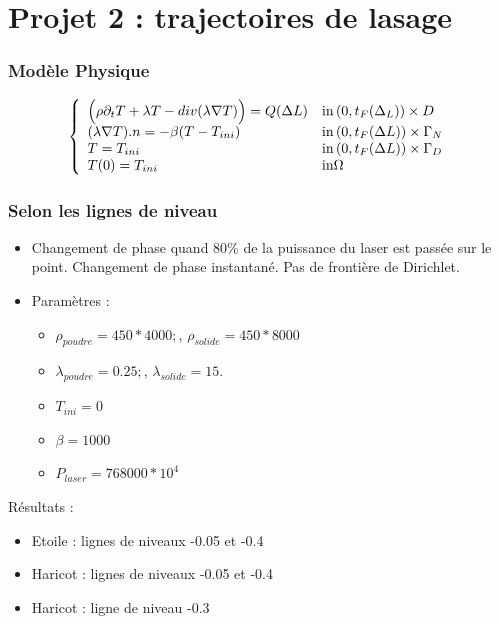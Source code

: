\documentclass{beamer}
\begin{document}
	
	\section{Projet 2 : trajectoires de lasage}
	
	\begin{frame}
		\frametitle{Modèle Physique}
		
		\begin{equation}
		\label{eq:ChaleurNormale}
		\left\{
		\begin{array}{ll}
		\Big(\rho\partial_t T+\lambda T-div(\lambda\nabla T)\Big)=Q(\Delta L)& \textrm{in\,}(0,t_F(\Delta_L))\times D \\
		(\lambda\nabla T).n=-\beta(T-T_{ini}) & \textrm{in\,}(0,t_F(\Delta L))\times \Gamma_N \\
		T=T_{ini} & \textrm{in\,}(0,t_F(\Delta L))\times \Gamma_D \\
		T(0)=T_{ini} & \textrm{in} \Omega
		\end{array}
		\right.
		\end{equation}
		
	\end{frame}
	
	
	
	\begin{frame}
		\frametitle{Selon les lignes de niveau}
		
		\begin{itemize}
			\item Changement de phase quand 80\% de la puissance du laser est passée sur le point. Changement de phase instantané. Pas de frontière de Dirichlet.
			\item Paramètres :
			\begin{itemize}
				\item $\rho_{poudre}=450*4000;$, $\rho_{solide}=450*8000$
				\item $\lambda_{poudre}=0.25;$, $\lambda_{solide}=15.$
				\item $T_{ini}=0$
				\item $\beta=1000$
				\item $P_{laser}=768000*10^4$
			\end{itemize}
		\end{itemize}
		
		Résultats :
		\begin{itemize}
			\item Etoile : lignes de niveaux -0.05 et -0.4 
			\item Haricot : lignes de niveaux -0.05 et -0.4
			\item Haricot : ligne de niveau -0.3
		\end{itemize}
		
	\end{frame}
\end{document}
